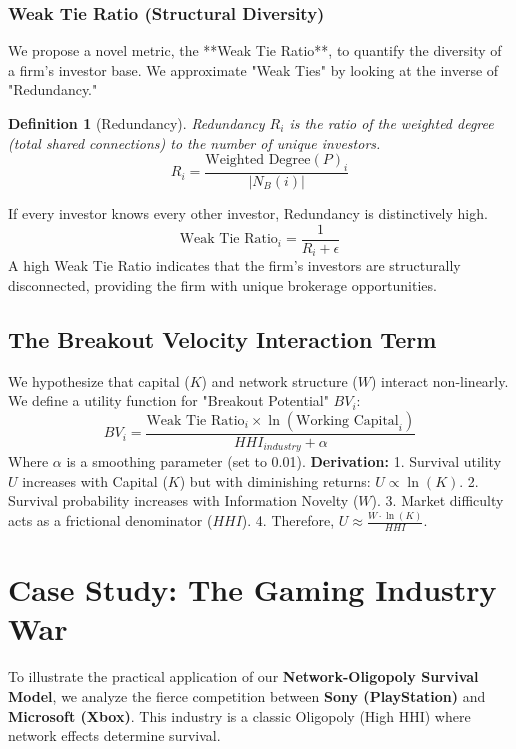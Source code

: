 \documentclass[11pt, a4paper]{article}
\newtheorem{definition}{Definition}
\begin{document}
\subsubsection{Weak Tie Ratio (Structural Diversity)}
We propose a novel metric, the **Weak Tie Ratio**, to quantify the diversity of a firm's investor base. We approximate "Weak Ties" by looking at the inverse of "Redundancy."
\begin{definition}[Redundancy]
    Redundancy $R_i$ is the ratio of the weighted degree (total shared connections) to the number of unique investors.
    $$ R_i = \frac{\text{Weighted Degree}(P)_i}{|N_B(i)|} $$
\end{definition}
If every investor knows every other investor, Redundancy is distinctively high.
\begin{equation}
    \text{Weak Tie Ratio}_i = \frac{1}{R_i + \epsilon}
\end{equation}
A high Weak Tie Ratio indicates that the firm's investors are structurally disconnected, providing the firm with unique brokerage opportunities.

\subsection{The Breakout Velocity Interaction Term}
We hypothesize that capital ($K$) and network structure ($W$) interact non-linearly. We define a utility function for "Breakout Potential" $BV_i$:
\begin{equation}
    BV_i = \frac{\text{Weak Tie Ratio}_i \times \ln(\text{Working Capital}_i)}{HHI_{industry} + \alpha}
\end{equation}
Where $\alpha$ is a smoothing parameter (set to 0.01).
\textbf{Derivation:}
1.  Survival utility $U$ increases with Capital ($K$) but with diminishing returns: $U \propto \ln(K)$.
2.  Survival probability increases with Information Novelty ($W$).
3.  Market difficulty acts as a frictional denominator ($HHI$).
4.  Therefore, $U \approx \frac{W \cdot \ln(K)}{HHI}$.

\section{Case Study: The Gaming Industry War}
\label{sec:gaming}

To illustrate the practical application of our \textbf{Network-Oligopoly Survival Model}, we analyze the fierce competition between \textbf{Sony (PlayStation)} and \textbf{Microsoft (Xbox)}. This industry is a classic Oligopoly (High HHI) where network effects determine survival.
\end{document}

